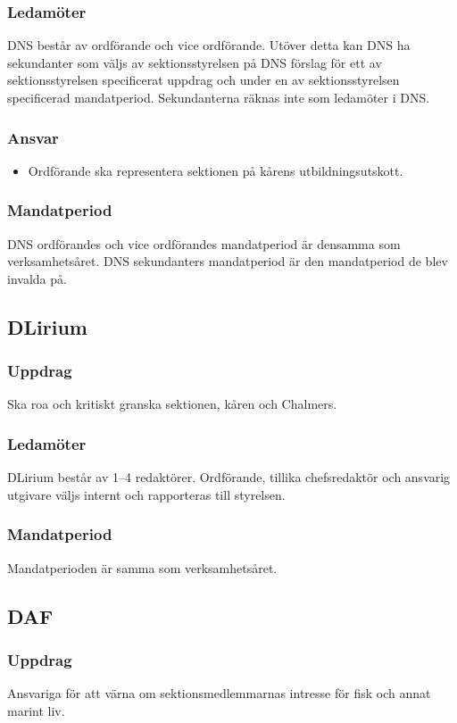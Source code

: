 \subsubsection{Ledamöter}
DNS består av ordförande och vice ordförande. Utöver detta kan DNS ha sekundanter som väljs av sektionsstyrelsen på DNS förslag för ett av sektionsstyrelsen specificerat uppdrag och under en av sektionsstyrelsen specificerad mandatperiod. Sekundanterna räknas inte som ledamöter i DNS.
\subsubsection{Ansvar}
\begin{itemize}
  \item Ordförande ska representera sektionen på kårens utbildningsutskott.
\end{itemize}
\subsubsection{Mandatperiod}
DNS ordförandes och vice ordförandes mandatperiod är densamma som verksamhetsåret. DNS sekundanters mandatperiod är den mandatperiod de blev invalda på.

\subsection{DLirium}
\subsubsection{Uppdrag}
Ska roa och kritiskt granska sektionen, kåren och Chalmers. 
\subsubsection{Ledamöter}
DLirium består av 1--4 redaktörer. Ordförande, tillika chefsredaktör och ansvarig utgivare väljs internt och rapporteras till styrelsen.
\subsubsection{Mandatperiod}
Mandatperioden är samma som verksamhetsåret. 

\subsection{DAF}
\subsubsection{Uppdrag}
Ansvariga för att värna om sektionsmedlemmarnas intresse för fisk och
annat marint liv.
